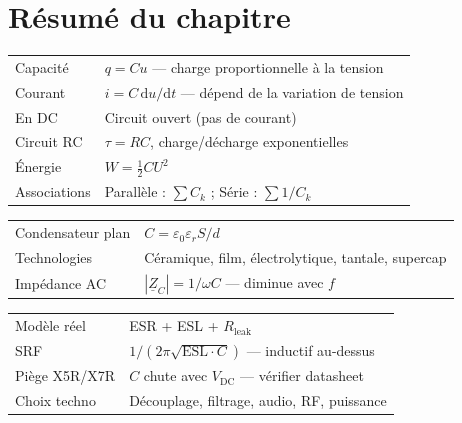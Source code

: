 \documentclass[12pt,a4paper,twoside]{book}
\begin{document}
\section*{Résumé du chapitre}

\begin{bases}[title={\color{white} Résumé --- Les Bases}]
\begin{center}
\renewcommand{\arraystretch}{1.3}
\begin{tabular}{p{4cm}p{9cm}}
\toprule
Capacité & $q = Cu$ --- charge proportionnelle à la tension \\
Courant & $i = C\,\mathrm{d}u/\mathrm{d}t$ --- dépend de la variation de tension \\
En DC & Circuit ouvert (pas de courant) \\
Circuit RC & $\tau = RC$, charge/décharge exponentielles \\
Énergie & $W = \frac{1}{2}CU^2$ \\
Associations & Parallèle : $\sum C_k$ ; Série : $\sum 1/C_k$ \\
\bottomrule
\end{tabular}
\end{center}
\end{bases}

\begin{approfondissement}[title={\color{white} Résumé --- Approfondissement}]
\begin{center}
\renewcommand{\arraystretch}{1.3}
\begin{tabular}{p{4cm}p{9cm}}
\toprule
Condensateur plan & $C = \varepsilon_0\varepsilon_r S/d$ \\
Technologies & Céramique, film, électrolytique, tantale, supercap \\
Impédance AC & $|\underline{Z}_C| = 1/\omega C$ --- diminue avec $f$ \\
\bottomrule
\end{tabular}
\end{center}
\end{approfondissement}

\begin{ingenieur}[title={\color{white} Résumé --- Niveau Ingénieur}]
\begin{center}
\renewcommand{\arraystretch}{1.3}
\begin{tabular}{p{4cm}p{9cm}}
\toprule
Modèle réel & ESR + ESL + $R_{\text{leak}}$ \\
SRF & $1/(2\pi\sqrt{\text{ESL}\cdot C})$ --- inductif au-dessus \\
Piège X5R/X7R & $C$ chute avec $V_{\text{DC}}$ --- vérifier datasheet \\
Choix techno & Découplage, filtrage, audio, RF, puissance \\
\bottomrule
\end{tabular}
\end{center}
\end{ingenieur}
\end{document}
